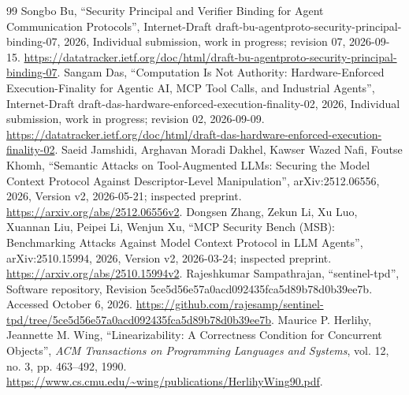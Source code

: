 \begin{thebibliography}{99}
 Songbo Bu, ``Security Principal and Verifier Binding for Agent Communication Protocols'', Internet-Draft draft-bu-agentproto-security-principal-binding-07, 2026, Individual submission, work in progress; revision 07, 2026-09-15. \url{https://datatracker.ietf.org/doc/html/draft-bu-agentproto-security-principal-binding-07}.
 Sangam Das, ``Computation Is Not Authority: Hardware-Enforced Execution-Finality for Agentic AI, MCP Tool Calls, and Industrial Agents'', Internet-Draft draft-das-hardware-enforced-execution-finality-02, 2026, Individual submission, work in progress; revision 02, 2026-09-09. \url{https://datatracker.ietf.org/doc/html/draft-das-hardware-enforced-execution-finality-02}.
 Saeid Jamshidi, Arghavan Moradi Dakhel, Kawser Wazed Nafi, Foutse Khomh, ``Semantic Attacks on Tool-Augmented LLMs: Securing the Model Context Protocol Against Descriptor-Level Manipulation'', arXiv:2512.06556, 2026, Version v2, 2026-05-21; inspected preprint. \url{https://arxiv.org/abs/2512.06556v2}.
 Dongsen Zhang, Zekun Li, Xu Luo, Xuannan Liu, Peipei Li, Wenjun Xu, ``MCP Security Bench (MSB): Benchmarking Attacks Against Model Context Protocol in LLM Agents'', arXiv:2510.15994, 2026, Version v2, 2026-03-24; inspected preprint. \url{https://arxiv.org/abs/2510.15994v2}.
 Rajeshkumar Sampathrajan, ``sentinel-tpd'', Software repository, Revision 5ce5d56e57a0acd092435fca5d89b78d0b39ee7b. Accessed October 6, 2026. \url{https://github.com/rajesamp/sentinel-tpd/tree/5ce5d56e57a0acd092435fca5d89b78d0b39ee7b}.
 Maurice P. Herlihy, Jeannette M. Wing, ``Linearizability: A Correctness Condition for Concurrent Objects'', \emph{ACM Transactions on Programming Languages and Systems}, vol. 12, no. 3, pp. 463--492, 1990. \url{https://www.cs.cmu.edu/~wing/publications/HerlihyWing90.pdf}.
\end{thebibliography}


